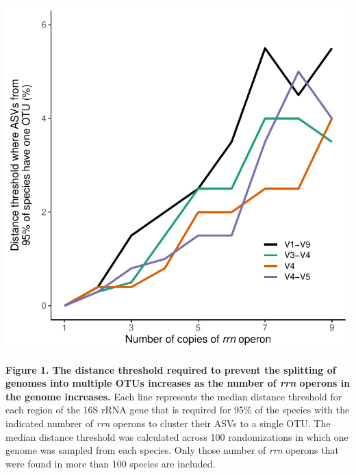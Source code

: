 \documentclass[
]{article}
\begin{document}
\setlength{\parindent}{0in}
\setlength{\leftskip}{0in}

\newpage

\includegraphics{../figures/copy_number_threshold_plot.pdf}

\textbf{Figure 1. The distance threshold required to prevent the
splitting of genomes into multiple OTUs increases as the number of
\emph{rrn} operons in the genome increases.} Each line represents the
median distance threshold for each region of the 16S rRNA gene that is
required for 95\% of the species with the indicated numbrer of
\emph{rrn} operons to cluster their ASVs to a single OTU. The median
distance threshold was calculated across 100 randomizations in which one
genome was sampled from each species. Only those number of \emph{rrn}
operons that were found in more than 100 species are included.

\newpage
\end{document}
